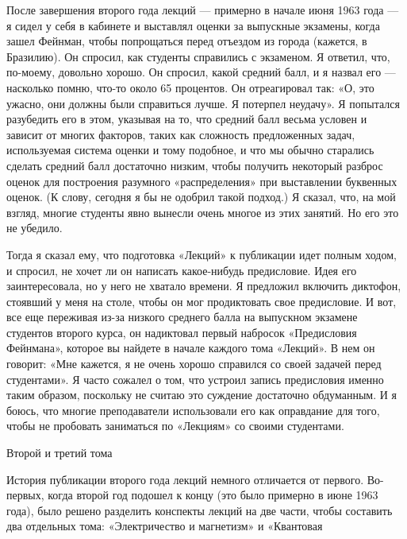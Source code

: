 \documentclass[11pt,oneside]{article}
\begin{document}
После завершения второго года лекций --- примерно в начале июня 1963 года --- я сидел у себя в кабинете и выставлял оценки за выпускные экзамены, когда зашел Фейнман, чтобы попрощаться перед отъездом из города (кажется, в Бразилию). Он спросил, как студенты справились с экзаменом. Я ответил, что, по-моему, довольно хорошо. Он спросил, какой средний балл, и я назвал его --- насколько помню, что-то около 65 процентов. Он отреагировал так: «О, это ужасно, они должны были справиться лучше. Я потерпел неудачу». Я попытался разубедить его в этом, указывая на то, что средний балл весьма условен и зависит от многих факторов, таких как сложность предложенных задач, используемая система оценки и тому подобное, и что мы обычно старались сделать средний балл достаточно низким, чтобы получить некоторый разброс оценок для построения разумного «распределения» при выставлении буквенных оценок. (К слову, сегодня я бы не одобрил такой подход.) Я сказал, что, на мой взгляд, многие студенты явно вынесли очень многое из этих занятий. Но его это не убедило.\par



Тогда я сказал ему, что подготовка «Лекций» к публикации идет полным ходом, и спросил, не хочет ли он написать какое-нибудь предисловие. Идея его заинтересовала, но у него не хватало времени. Я предложил включить диктофон, стоявший у меня на столе, чтобы он мог продиктовать свое предисловие. И вот, все еще переживая из-за низкого среднего балла на выпускном экзамене студентов второго курса, он надиктовал первый набросок «Предисловия Фейнмана», которое вы найдете в начале каждого тома «Лекций». В нем он говорит: «Мне кажется, я не очень хорошо справился со своей задачей перед студентами». Я часто сожалел о том, что устроил запись предисловия именно таким образом, поскольку не считаю это суждение достаточно обдуманным. И я боюсь, что многие преподаватели использовали его как оправдание для того, чтобы не пробовать заниматься по «Лекциям» со своими студентами.\par



Второй и третий тома\par



История публикации второго года лекций немного отличается от первого. Во-первых, когда второй год подошел к концу (это было примерно в июне 1963 года), было решено разделить конспекты лекций на две части, чтобы составить два отдельных тома: «Электричество и магнетизм» и «Квантовая\par
\end{document}
